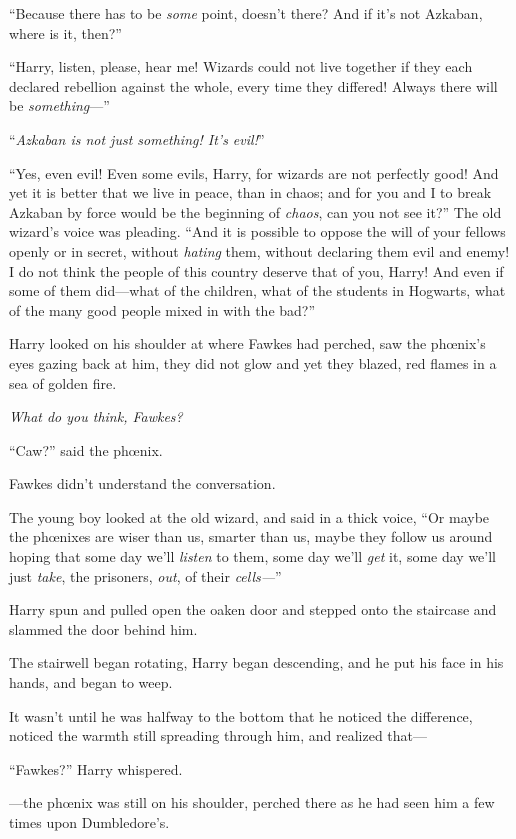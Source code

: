 “Because there has to be \emph{some} point, doesn’t there? And if it’s not Azkaban, where is it, then?”

“Harry, listen, please, hear me! Wizards could not live together if they each declared rebellion against the whole, every time they differed! Always there will be \emph{something}—”

“\emph{Azkaban is not just something! It’s evil!}”

“Yes, even evil! Even some evils, Harry, for wizards are not perfectly good! And yet it is better that we live in peace, than in chaos; and for you and I to break Azkaban by force would be the beginning of \emph{chaos}, can you not see it?” The old wizard’s voice was pleading. “And it is possible to oppose the will of your fellows openly or in secret, without \emph{hating} them, without declaring them evil and enemy! I do not think the people of this country deserve that of you, Harry! And even if some of them did—what of the children, what of the students in Hogwarts, what of the many good people mixed in with the bad?”

Harry looked on his shoulder at where Fawkes had perched, saw the phœnix’s eyes gazing back at him, they did not glow and yet they blazed, red flames in a sea of golden fire.

\emph{What do you think, Fawkes?}

“Caw?” said the phœnix.

Fawkes didn’t understand the conversation.

The young boy looked at the old wizard, and said in a thick voice, “Or maybe the phœnixes are wiser than us, smarter than us, maybe they follow us around hoping that some day we’ll \emph{listen} to them, some day we’ll \emph{get} it, some day we’ll just \emph{take}, the prisoners, \emph{out}, of their \emph{cells—}”

Harry spun and pulled open the oaken door and stepped onto the staircase and slammed the door behind him.

The stairwell began rotating, Harry began descending, and he put his face in his hands, and began to weep.

It wasn’t until he was halfway to the bottom that he noticed the difference, noticed the warmth still spreading through him, and realized that—

“Fawkes?” Harry whispered.

—the phœnix was still on his shoulder, perched there as he had seen him a few times upon Dumbledore’s.

